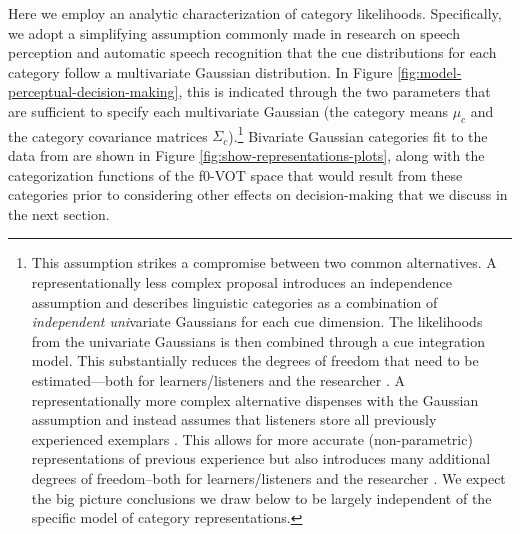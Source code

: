 \documentclass[
  11pt,
  man,floatsintext]{apa6}
\begin{document}
Here we employ an analytic characterization of category likelihoods. Specifically, we adopt a simplifying assumption commonly made in research on speech perception \autocite{clayards2008,feldman2009,kleinschmidt-jaeger2015,norris-mcqueen2008} and automatic speech recognition \autocite{jurafsky-martin2000} that the cue distributions for each category follow a multivariate Gaussian distribution. In Figure \ref{fig:model-perceptual-decision-making}, this is indicated through the two parameters that are sufficient to specify each multivariate Gaussian (the category means \(\mu_c\) and the category covariance matrices \(\Sigma_c\)).\footnote{\label{fn:alternative-representational-changes} This assumption strikes a compromise between two common alternatives. A representationally less complex proposal introduces an independence assumption and describes linguistic categories as a combination of \emph{independent uni}variate Gaussians for each cue dimension. The likelihoods from the univariate Gaussians is then combined through a cue integration model. This substantially reduces the degrees of freedom that need to be estimated---both for learners/listeners and the researcher \autocite[see][]{toscano-mcmurray2010}. A representationally more complex alternative dispenses with the Gaussian assumption and instead assumes that listeners store all previously experienced exemplars \autocite[or some pruned set of exemplars,][]{pierrehumbert2001}. This allows for more accurate (non-parametric) representations of previous experience but also introduces many additional degrees of freedom--both for learners/listeners and the researcher \autocite[for discussion, see][]{apfelbaum-mcmurray2015}. We expect the big picture conclusions we draw below to be largely independent of the specific model of category representations.} Bivariate Gaussian categories fit to the data from \textcite{chodroff-wilson2018} are shown in Figure \ref{fig:show-representations-plots}, along with the categorization functions of the f0-VOT space that would result from these categories prior to considering other effects on decision-making that we discuss in the next section.
\end{document}
